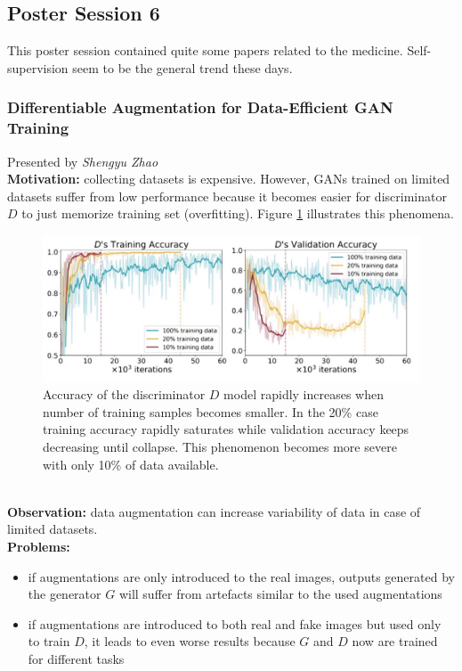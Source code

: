 \subsection{Poster Session 6}

This poster session contained quite some papers related to the medicine.
Self-supervision seem to be the general trend these days.


\spacerule
\subsubsection{Differentiable Augmentation for Data-Efficient GAN Training \cite{ZhaoLLZ020}}

Presented by \textit{Shengyu Zhao} \\

{\bf Motivation:} collecting datasets is expensive. 
However, GANs trained on limited datasets suffer from low performance because it becomes easier for discriminator $D$ to just memorize training set (overfitting). Figure \ref{fig:gan_overfitting_on_limited_data} illustrates this phenomena. \\

\begin{figure}[h!]
    \centering
    \includegraphics[scale=0.4]{neurips-2020/images/Screenshot 2020-12-11 at 10.29.55.png}
    \caption{Accuracy of the discriminator $D$ model rapidly increases when number of training samples becomes smaller. In the 20\% case training accuracy rapidly saturates while validation accuracy keeps decreasing until collapse. This phenomenon becomes more severe with only 10\% of data available.}
    \label{fig:gan_overfitting_on_limited_data}
\end{figure} \\

{\bf Observation:} data augmentation can increase variability of data in case of limited datasets. \\

{\bf Problems:}
\begin{itemize}
    \item if augmentations are only introduced to the real images, outputs generated by the generator $G$ will suffer from artefacts similar to the used augmentations
    \item if augmentations are introduced to both real and fake images but used only to train $D$, it leads to even worse results because $G$ and $D$ now are trained for different tasks
\end{itemize} \\

